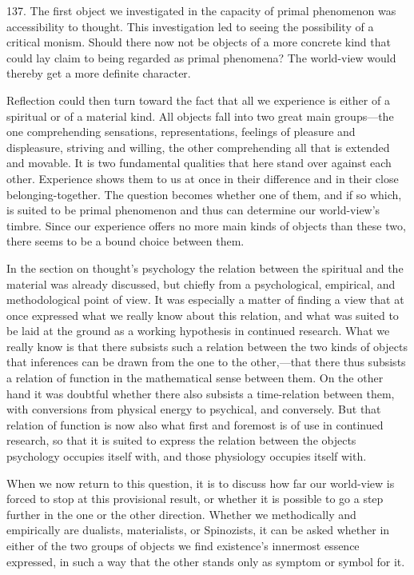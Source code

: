 \documentclass[12pt,a4paper]{book}
\newcommand{\opage}[1]{\marginnote{\footnotesize\textit{[#1]}}}
\begin{document}
\opage{329}137. The first object we investigated in the capacity of primal phenomenon was
accessibility to thought. This investigation led to seeing the possibility of a critical
monism. Should there now not be objects of a more concrete kind that could lay claim to
being regarded as primal phenomena? The world-view would thereby get a more definite
character.

Reflection could then turn toward the fact that all we experience is either of a spiritual
or of a material kind. All objects fall into two great main groups---the one comprehending
sensations, representations, feelings of pleasure and displeasure, striving and willing, the
other comprehending all that is extended and movable. It is two fundamental qualities that
here stand over against each other. Experience shows them to us at once in their difference
and in their close belonging-together. The question becomes whether one of them, and if so
which, is suited to be primal phenomenon and thus can determine our world-view's timbre.
Since our experience offers no more main kinds of objects than these two, there seems to be a
bound choice between them.

In the section on thought's psychology the relation between the spiritual and the material
was already discussed, but chiefly from a psychological, empirical, and methodological
point of view. It was especially a matter of finding a view that at once expressed what we
really know about this relation, and what was suited to be laid at the ground as a working
hypothesis in continued research. What we really know is that there subsists such a relation
between the two kinds of objects that inferences can be drawn from the one to the other,---that
there thus subsists a relation of function in the mathematical sense between them. On the other
hand it was doubtful whether there also subsists a time-relation between them, with conversions
from physical energy to psychical, and conversely. But that relation of function is now also
what first and foremost is of use in continued research, so that it is suited to \opage{330}express the
relation between the objects psychology occupies itself with, and those physiology occupies
itself with.

When we now return to this question, it is to discuss how far our world-view is forced to stop
at this provisional result, or whether it is possible to go a step further in the one or the
other direction. Whether we methodically and empirically are dualists, materialists, or
Spinozists, it can be asked whether in either of the two groups of objects we find existence's
innermost essence expressed, in such a way that the other stands only as symptom or symbol for
it.
\end{document}
